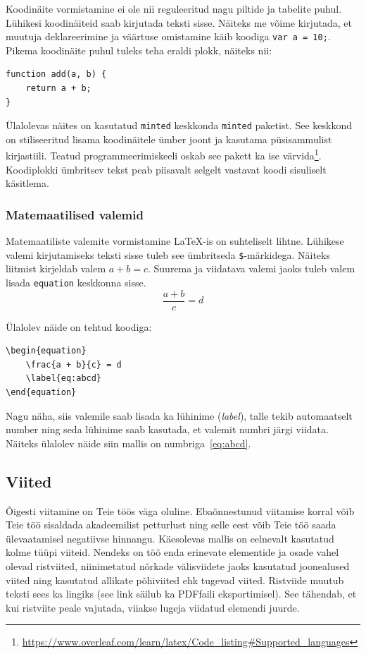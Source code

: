 Koodinäite vormistamine ei ole nii reguleeritud nagu piltide ja tabelite puhul. Lühikesi koodinäiteid saab kirjutada teksti sisse. Näiteks me võime kirjutada, et muutuja deklareerimine ja väärtuse omistamine käib koodiga \verb|var a = 10;|. Pikema koodinäite puhul tuleks teha eraldi plokk, näiteks nii:

\begin{verbatim}
function add(a, b) {
    return a + b;
}
\end{verbatim}

Ülalolevas näites on kasutatud \verb|minted| keskkonda \verb|minted| paketist. See keskkond on stiliseeritud lisama koodinäitele ümber joont ja kasutama püsisammulist kirjastiili. Teatud programmeerimiskeeli oskab see pakett ka ise värvida\footnote{\url{https://www.overleaf.com/learn/latex/Code_listing\#Supported_languages}}. Koodiplokki ümbritsev tekst peab piisavalt selgelt vastavat koodi sisuliselt käsitlema.

\subsubsection{Matemaatilised valemid}
Matemaatiliste valemite vormistamine LaTeX-is on suhteliselt lihtne. Lühikese valemi kirjutamiseks teksti sisse tuleb see ümbritseda \verb|$|-märkidega. Näiteks liitmist kirjeldab valem $a+b=c$. Suurema ja viidatava valemi jaoks tuleb valem lisada \verb|equation| keskkonna sisse.
\begin{equation}
    \frac{a + b}{c} = d
    \label{eq:abcd}
\end{equation}

Ülalolev näide on tehtud koodiga:
\begin{verbatim}
\begin{equation}
    \frac{a + b}{c} = d
    \label{eq:abcd}
\end{equation}
\end{verbatim}

Nagu näha, siis valemile saab lisada ka lühinime (\emph{label}), talle tekib automaatselt number ning seda lühinime saab kasutada, et valemit numbri järgi viidata. Näiteks ülalolev näide siin mallis on numbriga~\ref{eq:abcd}.

\subsection{Viited}
Õigesti viitamine on Teie töös väga oluline. Ebaõnnestunud viitamise korral võib Teie töö sisaldada akadeemilist petturlust ning selle eest võib Teie töö saada ülevaatamisel negatiivse hinnangu. Käesolevas mallis on eelnevalt kasutatud kolme tüüpi viiteid. Nendeks on töö enda erinevate elementide ja osade vahel olevad ristviited, niinimetatud nõrkade välisviidete jaoks kasutatud joonealused viited ning kasutatud allikate põhiviited ehk tugevad viited. Ristviide muutub teksti sees ka lingiks (see link säilub ka PDF{}faili eksportimisel). See tähendab, et kui ristviite peale vajutada, viiakse lugeja viidatud elemendi juurde.

